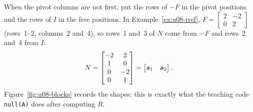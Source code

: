 When the pivot columns are not first, put the rows of $-F$ in the pivot positions and the rows
of $I$ in the free positions. In Example~\ref{ex:u08-rref}, $F=\begin{bmatrix}2&-2\\0&2\end{bmatrix}$
(rows~1--2, columns~2 and~4), so rows~1 and~3 of $N$ come from $-F$ and rows~2 and~4 from $I$:
\[
N=\begin{bmatrix}-2&2\\1&0\\0&-2\\0&1\end{bmatrix}=\begin{bmatrix}\boldsymbol{s}_1&\boldsymbol{s}_2\end{bmatrix}.
\]
Figure~\ref{fig:u08-blocks} records the shapes; this is exactly what the teaching code
\texttt{null(A)} does after computing $R$.

